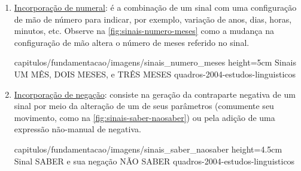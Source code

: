\begin{enumerate}
\begin{enumerate}
        

        \item \underline{Incorporação de numeral}: é a combinação de um sinal com uma configuração de mão de número para indicar, por exemplo, variação de anos, dias, horas, minutos, etc. Observe na \autoref{fig:sinais-numero-meses} como a mudança na configuração de mão altera o número de meses referido no sinal.
        
        
            {capitulos/fundamentacao/imagens/sinais_numero_meses} %
            {height=5cm} %
            {Sinais UM MÊS, DOIS MESES, e TRÊS MESES} %
            {quadros-2004-estudos-linguisticos} %



        \item \underline{Incorporação de negação}: consiste na geração da contraparte negativa de um sinal por meio da alteração de um de seus parâmetros (comumente seu movimento, como na \autoref{fig:sinais-saber-naosaber}) ou pela adição de uma expressão não-manual de negativa.
        
        
            {capitulos/fundamentacao/imagens/sinais_saber_naosaber} %
            {height=4.5cm} %
            {Sinal SABER e sua negação NÃO SABER} %
            {quadros-2004-estudos-linguisticos} %




\end{enumerate}
\end{enumerate}
